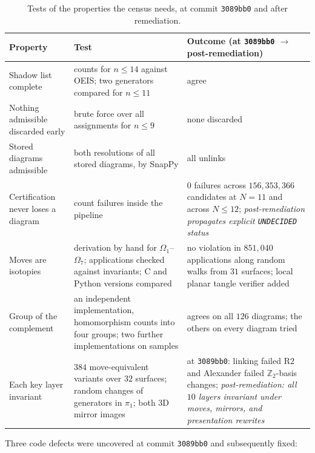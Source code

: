 \documentclass[11pt]{amsart}
\newcommand{\Z}{\mathbb{Z}}
\newcommand{\lab}[1]{\texttt{#1}}
\theoremstyle{plain}
\theoremstyle{remark}
\begin{document}
\begin{table}[H]
\centering
\small
\begin{tabular}{@{}>{\raggedright\arraybackslash}p{}>{\raggedright\arraybackslash}p{}>{\raggedright\arraybackslash}p{}@{}}
\toprule
Property & Test & Outcome (at \texttt{3089bb0} $\to$ post-remediation) \\
\midrule
Shadow list complete & counts for $n\le 14$ against OEIS; two generators compared for $n\le 11$ & agree \\
Nothing admissible discarded early & brute force over all assignments for $n\le 9$ & none discarded \\
Stored diagrams admissible & both resolutions of all stored diagrams, by SnapPy & all unlinks \\
Certification never loses a diagram & count failures inside the pipeline & $0$ failures across $156{,}353{,}366$ candidates at $N=11$ and across $N\le 12$; \emph{post-remediation propagates explicit \lab{UNDECIDED} status} \\
Moves are isotopies & derivation by hand for $\Omega_1$--$\Omega_7$; applications checked against invariants; C and Python versions compared & no violation in $851{,}040$ applications along random walks from $31$ surfaces; local planar tangle verifier added \\
Group of the complement & an independent implementation, homomorphism counts into four groups; two further implementations on samples & agrees on all $126$ diagrams; the others on every diagram tried \\
Each key layer invariant & $384$ move-equivalent variants over $32$ surfaces; random changes of generators in $\pi_1$; both 3D mirror images & at \texttt{3089bb0}: linking failed $\mathrm{R2}$ and Alexander failed $\Z_2$-basis changes; \emph{post-remediation: all $10$ layers invariant under moves, mirrors, and presentation rewrites} \\
\bottomrule
\end{tabular}
\caption{Tests of the properties the census needs, at commit \texttt{3089bb0} and after remediation.}
\label{tab:evidence}
\end{table}

Three code defects were uncovered at commit \texttt{3089bb0} and subsequently fixed:
\end{document}
